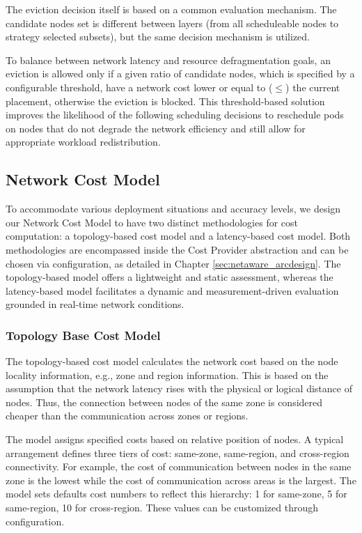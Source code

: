 The eviction decision itself is based on a common evaluation mechanism. The candidate nodes set is different between layers (from all scheduleable nodes to strategy selected subsets), but the same decision mechanism is utilized. 

To balance between network latency and resource defragmentation goals, an eviction is allowed only if a given ratio of candidate nodes, which is specified by a configurable threshold, have a network cost lower or equal to ($\leq$) the current placement, otherwise the eviction is blocked. This threshold-based solution improves the likelihood of the following scheduling decisions to reschedule pods on nodes that do not degrade the network efficiency and still allow for appropriate workload redistribution.

\subsection{Network Cost Model}
\label{sec:netaware_costmodel}
To accommodate various deployment situations and accuracy levels, we design our Network Cost Model to have two distinct methodologies for cost computation: a topology-based cost model and a latency-based cost model. Both methodologies are encompassed inside the Cost Provider abstraction and can be chosen via configuration, as detailed in Chapter \ref{sec:netaware_arcdesign}. The topology-based model offers a lightweight and static assessment, whereas the latency-based model facilitates a dynamic and measurement-driven evaluation grounded in real-time network conditions.
\subsubsection{Topology Base Cost Model}
\label{sec:netaware_topologycostmodel}
The topology-based cost model calculates the network cost based on the node locality information, e.g., zone and region information. This is based on the assumption that the network latency rises with the physical or logical distance of nodes. Thus, the connection between nodes of the same zone is considered cheaper than the communication across zones or regions.

The model assigns specified costs based on relative position of nodes. A typical arrangement defines three tiers of cost: same-zone, same-region, and cross-region connectivity. For example, the cost of communication between nodes in the same zone is the lowest while the cost of communication across areas is the largest. The model sets defaults cost numbers to reflect this hierarchy: 1 for same-zone, 5 for same-region, 10 for cross-region. These values can be customized through configuration.

